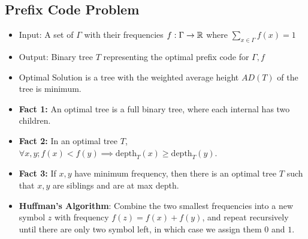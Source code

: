 \documentclass[a4paper,12pt]{article}
\begin{document}
\subsection{Prefix Code Problem}
\begin{itemize}
    \item Input: A set of $\Gamma$ with their frequencies $f:\Gamma\to\mathbb{R}$ where $\sum_{x\in\Gamma}f(x)=1$
    \item Output: Binary tree $T$ representing the optimal prefix code for $\Gamma,f$
    \item Optimal Solution is a tree with the weighted average height $AD(T)$ of the tree is minimum.
    \item \textbf{Fact 1:} An optimal tree is a full binary tree, where each internal has two children.
    \item \textbf{Fact 2:} In an optimal tree $T$, $\forall x,y;f(x)<f(y)\implies \mathrm{depth}_T(x)\geq\mathrm{depth}_T(y)$.
    \item \textbf{Fact 3:} If $x,y$ have minimum frequency, then there is an optimal tree $T$ such that $x,y$ are siblings and are at max depth.
    \item \textbf{Huffman's Algorithm}: Combine the two smallest frequencies into a new symbol $z$ with frequency $f(z)=f(x)+f(y)$, and repeat recursively until there are only two symbol left, in which case we assign them $0$ and $1$.
\end{itemize}
\end{document}
